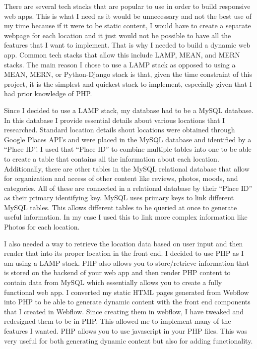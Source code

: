 \documentclass[12pt,twocolumn]{article}
\begin{document}
There are several tech stacks that are popular to use in order to build responsive web apps. This is what I need as it would be unnecessary and not the best use of my time because if it were to be static content, I would have to create a separate webpage for each location and it just would not be possible to have all the features that I want to implement. That is why I needed to build a dynamic web app. Common tech stacks that allow this include LAMP, MEAN, and MERN stacks. The main reason I chose to use a LAMP stack as opposed to using a MEAN, MERN, or Python-Django stack is that, given the time constraint of this project, it is the simplest and quickest stack to implement, especially given that I had prior knowledge of PHP. 

Since I decided to use a LAMP stack, my database had to be a MySQL database. In this database I provide essential details about various locations that I researched. Standard location details shout locations were obtained through Google Places API’s and were placed in the MySQL database and identified by a “Place ID”. I used that “Place ID” to combine multiple tables into one to be able to create a table that contains all the information about each location. Additionally, there are other tables in the MySQL relational database that allow for organization and access of other content like reviews, photos, moods, and categories. All of these are connected in a relational database by their “Place ID” as their primary identifying key. MySQL uses primary keys to link different MySQL tables. This allows different tables to be queried at once to generate useful information. In my case I used this to link more complex information like Photos for each location.

I also needed a way to retrieve the location data based on user input and then render that into its proper location in the front end. I decided to use PHP as I am using a LAMP stack. PHP also allows you to store/retrieve information that is stored on the backend of your web app and then render PHP content to contain data from MySQL which essentially allows you to create a fully functional web app. I converted my static HTML pages generated from Webflow into PHP to be able to generate dynamic content with the front end components that I created in Webflow. Since creating them in webflow, I have tweaked and redesigned them to be in PHP. This allowed me to implement many of the features I wanted. PHP allows you to use javascript in your PHP files. This was very useful for both generating dynamic content but also for adding functionality.
\end{document}
